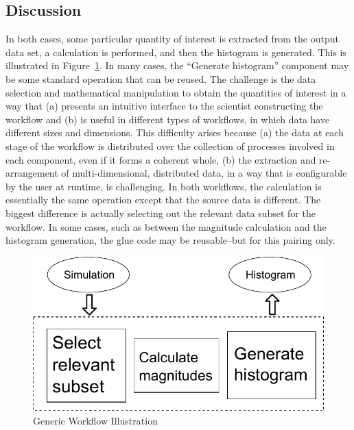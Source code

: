 \documentclass[conference]{IEEEtran}
\begin{document}
\subsection{Discussion}

In both cases, some particular quantity of interest is extracted from the
output data set, a calculation is performed, and then the histogram is
generated. This is illustrated in Figure~\ref{fig:generic-workflow}. In many
cases, the ``Generate histogram'' component may be some standard operation that
can be reused. The challenge is the data selection and mathematical
manipulation to obtain the quantities of interest in a way that (a) presents
an intuitive interface to the scientist constructing the workflow and (b) is useful in different
types of workflows, in which data have different sizes and dimensions.
This difficulty arises because (a) the data at each stage of the workflow
is distributed over the collection of processes
involved in each component, even if it forms a coherent whole, (b)
the extraction and re-arrangement of multi-dimensional, distributed data,
in a way that is configurable by the user at runtime, is challenging.
In both workflows, the calculation is essentially the same operation except
that the source data is different. The biggest difference is actually selecting out the relevant data
subset for the workflow. In some cases, such as between the magnitude
calculation and the histogram generation, the glue code may be reusable--but
for this pairing only.

\begin{figure}[htbp]
\centering
\includegraphics[width=\columnwidth]{fig/gwflow}
\caption{Generic Workflow Illustration}
\label{fig:generic-workflow}
\end{figure}
\end{document}
